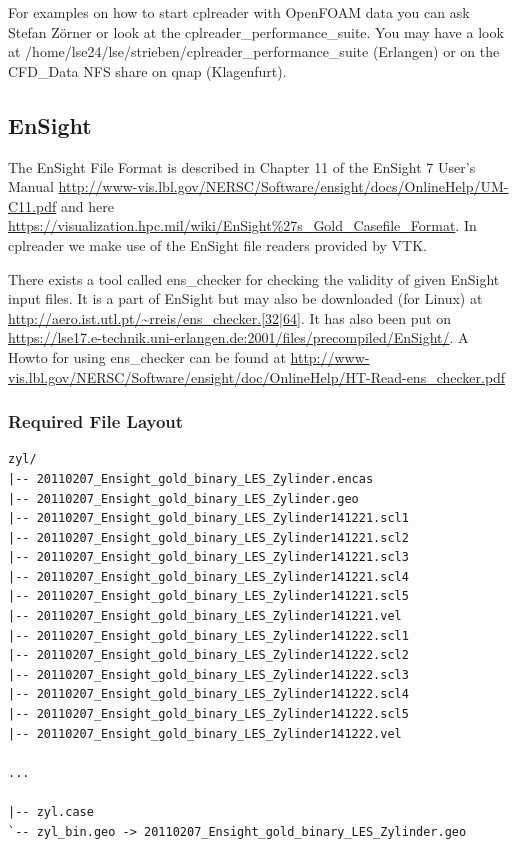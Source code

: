 \documentclass[a4paper,10pt]{article}
\begin{document}
For examples on  how to start cplreader with OpenFOAM data  you can ask Stefan
Zörner or look  at the cplreader\_performance\_suite.  You may  have a look at
/home/lse24/lse/strieben/cplreader\_performance\_suite  (Erlangen)  or on  the
CFD\_Data NFS share on qnap (Klagenfurt).

\newpage
\subsection{EnSight}
\label{sec:ensight}

The EnSight  File Format is  described in Chapter  11 of the EnSight  7 User's
Manual
\url{http://www-vis.lbl.gov/NERSC/Software/ensight/docs/OnlineHelp/UM-C11.pdf}
and                                                                        here
\url{https://visualization.hpc.mil/wiki/EnSight%27s_Gold_Casefile_Format}.   In
cplreader we make use of the EnSight file readers provided by VTK.

There  exists a tool  called ens\_checker  for checking  the validity  of given
EnSight input files. It  is a part of EnSight but may  also be downloaded (for
Linux) at \url{http://aero.ist.utl.pt/~rreis/ens_checker.[32|64]}. It has also
been                                   put                                  on
\url{https://lse17.e-technik.uni-erlangen.de:2001/files/precompiled/EnSight/}.
A     Howto     for     using      ens\_checker     can     be     found     at
\url{http://www-vis.lbl.gov/NERSC/Software/ensight/doc/OnlineHelp/HT-Read-ens_checker.pdf}



\subsubsection{Required File Layout}
\begin{verbatim}
zyl/
|-- 20110207_Ensight_gold_binary_LES_Zylinder.encas
|-- 20110207_Ensight_gold_binary_LES_Zylinder.geo
|-- 20110207_Ensight_gold_binary_LES_Zylinder141221.scl1
|-- 20110207_Ensight_gold_binary_LES_Zylinder141221.scl2
|-- 20110207_Ensight_gold_binary_LES_Zylinder141221.scl3
|-- 20110207_Ensight_gold_binary_LES_Zylinder141221.scl4
|-- 20110207_Ensight_gold_binary_LES_Zylinder141221.scl5
|-- 20110207_Ensight_gold_binary_LES_Zylinder141221.vel
|-- 20110207_Ensight_gold_binary_LES_Zylinder141222.scl1
|-- 20110207_Ensight_gold_binary_LES_Zylinder141222.scl2
|-- 20110207_Ensight_gold_binary_LES_Zylinder141222.scl3
|-- 20110207_Ensight_gold_binary_LES_Zylinder141222.scl4
|-- 20110207_Ensight_gold_binary_LES_Zylinder141222.scl5
|-- 20110207_Ensight_gold_binary_LES_Zylinder141222.vel

...

|-- zyl.case
`-- zyl_bin.geo -> 20110207_Ensight_gold_binary_LES_Zylinder.geo
\end{verbatim}
\end{document}
